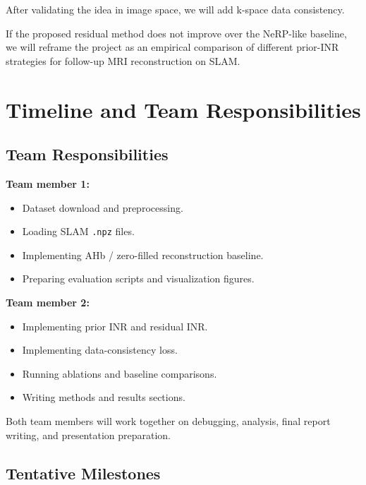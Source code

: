 \documentclass[11pt,a4paper]{article}
\begin{document}
After validating the idea in image space, we will add k-space data consistency.

If the proposed residual method does not improve over the NeRP-like baseline, we will reframe the project as an empirical comparison of different prior-INR strategies for follow-up MRI reconstruction on SLAM.

\section{Timeline and Team Responsibilities}

\subsection{Team Responsibilities}

\textbf{Team member 1:}
\begin{itemize}
    \item Dataset download and preprocessing.
    \item Loading SLAM \texttt{.npz} files.
    \item Implementing AHb / zero-filled reconstruction baseline.
    \item Preparing evaluation scripts and visualization figures.
\end{itemize}

\textbf{Team member 2:}
\begin{itemize}
    \item Implementing prior INR and residual INR.
    \item Implementing data-consistency loss.
    \item Running ablations and baseline comparisons.
    \item Writing methods and results sections.
\end{itemize}

Both team members will work together on debugging, analysis, final report writing, and presentation preparation.

\subsection{Tentative Milestones}
\end{document}
